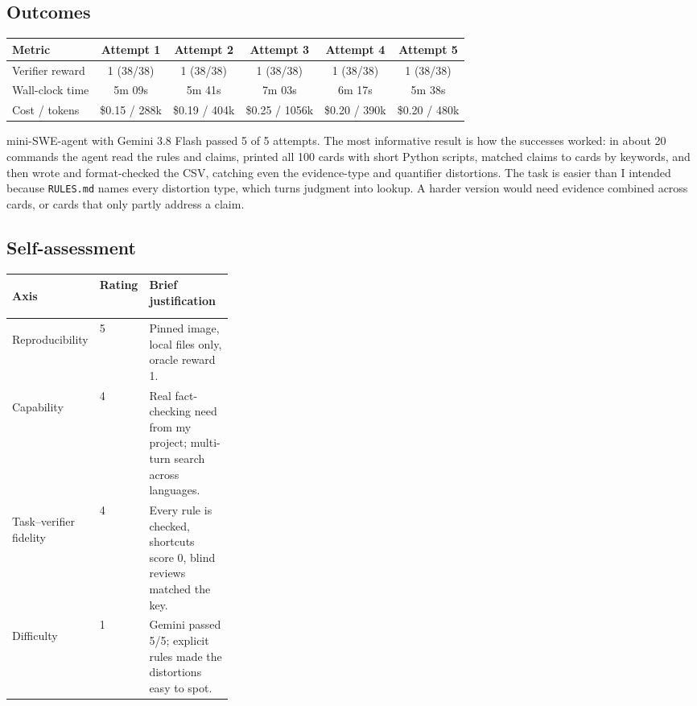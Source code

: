\documentclass[11pt]{article}
\begin{document}
\subsection*{Outcomes}
\begin{center}
\renewcommand{\arraystretch}{1.1}
\small
\begin{tabularx}{\linewidth}{>{\raggedright\arraybackslash}Xccccc}
  \toprule
  Metric & Attempt 1 & Attempt 2 & Attempt 3 & Attempt 4 & Attempt 5 \\
  \midrule
  Verifier reward & 1 (38/38) & 1 (38/38) & 1 (38/38) & 1 (38/38) & 1 (38/38) \\
  Wall-clock time & 5m 09s & 5m 41s & 7m 03s & 6m 17s & 5m 38s \\
  Cost / tokens & \$0.15 / 288k & \$0.19 / 404k & \$0.25 / 1056k & \$0.20 / 390k & \$0.20 / 480k \\
  \bottomrule
\end{tabularx}
\end{center}
mini-SWE-agent with Gemini 3.8 Flash passed 5 of 5 attempts.
The most informative result is how the successes worked: in about 20 commands the agent read the rules and
claims, printed all 100 cards with short Python scripts, matched claims to cards by keywords, and then wrote and
format-checked the CSV, catching even the evidence-type and quantifier distortions. The task is easier than I
intended because \texttt{RULES.md} names every distortion type, which turns judgment into lookup. A harder
version would need evidence combined across cards, or cards that only partly address a claim.

\subsection*{Self-assessment}
\begin{center}
\renewcommand{\arraystretch}{1.05}
\small
\begin{tabularx}{\linewidth}{>{\bfseries\raggedright\arraybackslash}p{0.22\linewidth}p{0.1\linewidth}X}
  \toprule
  Axis & Rating & Brief justification \\
  \midrule
  Reproducibility & 5 & Pinned image, local files only, oracle reward 1. \\
  Capability & 4 & Real fact-checking need from my project; multi-turn search across languages. \\
  Task--verifier fidelity & 4 & Every rule is checked, shortcuts score 0, blind reviews matched the key. \\
  Difficulty & 1 & Gemini passed 5/5; explicit rules made the distortions easy to spot. \\
  \bottomrule
\end{tabularx}
\end{center}
\end{document}
